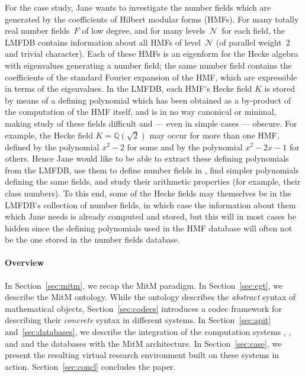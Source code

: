 \def\Q{{\mathbb Q}}
\def\N{{\mathcal{N}}}
For the \LMFDB case study, Jane wants to investigate the number fields which are generated by the coefficients of Hilbert modular forms (HMFs).
For many totally real number fields~$F$ of low degree, and for many levels~$\N$\ for each field, the LMFDB contains information about all HMFs of level~$\N$ (of parallel weight~$2$ and trivial character).
Each of these HMFs is an eigenform for the Hecke algebra with eigenvalues generating a number field; the same number field contains the coefficients of the standard Fourier expansion of the HMF, which are expressible in terms of the eigenvalues.
In the LMFDB, each HMF's Hecke field $K$ is stored by means of a defining polynomial which has been obtained as a by-product of the computation of the HMF itself, and is in no way canonical or minimal, making study of these fields difficult and --- even in simple cases --- obscure.
For example, the Hecke field $K=\Q(\sqrt{2})$ may occur for more than one HMF, defined by the polynomial $x^2-2$ for some and by the polynomial $x^2-2x-1$ for others.
Hence Jane would like to be able to extract these defining polynomials from the LMFDB, use them to define number fields in \Sage, find simpler polynomials defining the same fields, and study their arithmetic properties (for example, their class numbers).
To this end, some of the Hecke fields may themselves be in the LMFDB's collection of number fields, in which case the information about them which Jane needs is already computed and stored, but this will in most cases be hidden since the defining polynomials used in the HMF database will often not be the one stored in the number fields database.

\paragraph{Overview}
In Section~\ref{sec:mitm}, we recap the MitM paradigm.
In Section~\ref{sec:cgt}, we describe the MitM ontology.
While the ontology describes the \emph{abstract} syntax of mathematical objects, Section~\ref{sec:codecs} introduces a codec framework for describing their \emph{concrete} syntax in different systems.
In Section~\ref{sec:apit} and~\ref{sec:databases}, we describe the integration of the computation systems \GAP, \Sage, and \Singular and the \lmfdb databases with the MitM architecture.
In Section~\ref{sec:case}, we present the resulting virtual research environment built on
these systems in action.
Section~\ref{sec:concl} concludes the paper.

